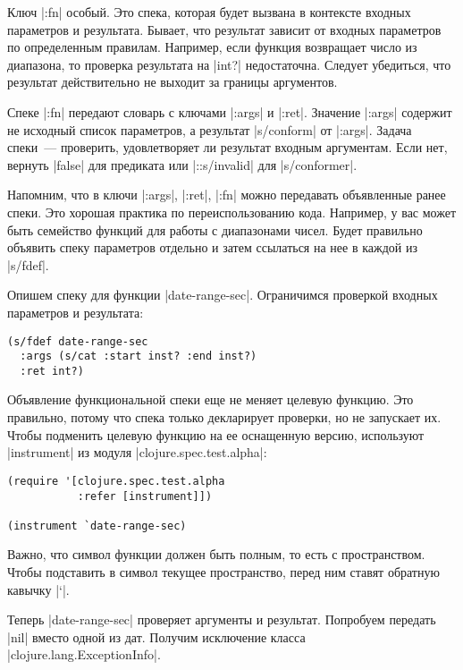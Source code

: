 Ключ \spverb|:fn| особый. Это спека, которая будет вызвана в контексте входных
параметров и результата. Бывает, что результат зависит от входных параметров по
определенным правилам. Например, если функция возвращает число из диапазона, то
проверка результата на \spverb|int?| недостаточна. Следует убедиться, что результат
действительно не выходит за границы аргументов.

Спеке \spverb|:fn| передают словарь с ключами \spverb|:args| и \spverb|:ret|. Значение \spverb|:args|
содержит не исходный список параметров, а результат \spverb|s/conform| от
\spverb|:args|. Задача спеки~--- проверить, удовлетворяет ли результат входным
аргументам. Если нет, вернуть \spverb|false| для предиката или \spverb|::s/invalid| для
\spverb|s/conformer|.

Напомним, что в ключи \spverb|:args|, \spverb|:ret|, \spverb|:fn| можно передавать объявленные ранее
спеки. Это хорошая практика по переиспользованию кода. Например, у вас может
быть семейство функций для работы с диапазонами чисел. Будет правильно объявить
спеку параметров отдельно и затем ссылаться на нее в каждой из \spverb|s/fdef|.

Опишем спеку для функции \spverb|date-range-sec|. Ограничимся проверкой входных
параметров и результата:

\begin{verbatim}
(s/fdef date-range-sec
  :args (s/cat :start inst? :end inst?)
  :ret int?)
\end{verbatim}

Объявление функциональной спеки еще не меняет целевую функцию. Это правильно,
потому что спека только декларирует проверки, но не запускает их. Чтобы
подменить целевую функцию на ее оснащенную версию, используют \spverb|instrument| из
модуля \spverb|clojure.spec.test.alpha|:

\begin{verbatim}
(require '[clojure.spec.test.alpha
           :refer [instrument]])

(instrument `date-range-sec)
\end{verbatim}

Важно, что символ функции должен быть полным, то есть с пространством. Чтобы
подставить в символ текущее пространство, перед ним ставят обратную кавычку \spverb|`|.

Теперь \spverb|date-range-sec| проверяет аргументы и результат. Попробуем передать
\spverb|nil| вместо одной из дат. Получим исключение класса
\spverb|clojure.lang.ExceptionInfo|.

